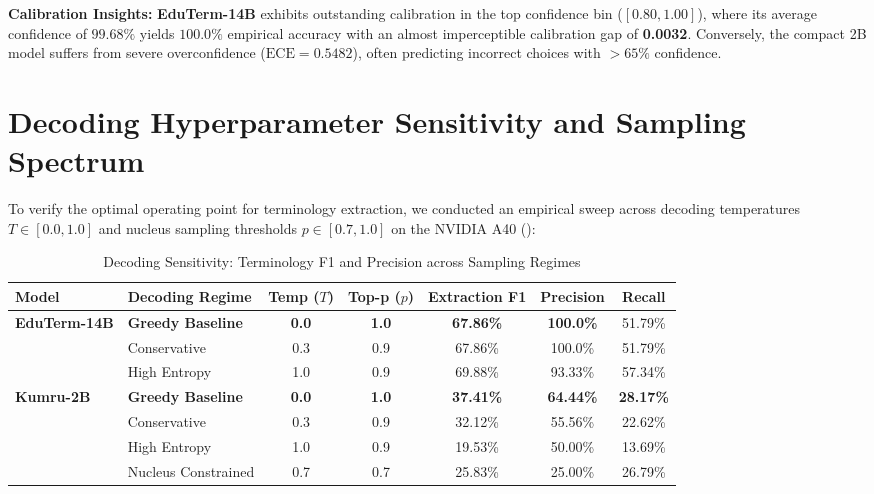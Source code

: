 \documentclass[a4paper,12pt]{report}
\begin{document}
\textbf{Calibration Insights:} \textbf{EduTerm-14B} exhibits outstanding calibration in the top confidence bin ($[0.80, 1.00]$), where its average confidence of $99.68\%$ yields $100.0\%$ empirical accuracy with an almost imperceptible calibration gap of \textbf{0.0032}. Conversely, the compact 2B model suffers from severe overconfidence ($\text{ECE} = 0.5482$), often predicting incorrect choices with $>65\%$ confidence.

\section{Decoding Hyperparameter Sensitivity and Sampling Spectrum}
\label{sec:decoding_sensitivity}
To verify the optimal operating point for terminology extraction, we conducted an empirical sweep across decoding temperatures $T \in [0.0, 1.0]$ and nucleus sampling thresholds $p \in [0.7, 1.0]$ on the NVIDIA A40 ():

\begin{table}[htbp]
\centering
\small
\caption{Decoding Sensitivity: Terminology F1 and Precision across Sampling Regimes}
\label{tab:decoding_sensitivity}
\scriptsize\setlength{\tabcolsep}{2pt}
\begin{tabularx}{\textwidth}{>{\RaggedRight\arraybackslash}Xlccccc}
\hline
\textbf{Model} & \textbf{Decoding Regime} & \textbf{Temp ($T$)} & \textbf{Top-p ($p$)} & \textbf{Extraction F1} & \textbf{Precision} & \textbf{Recall} \\
\hline
\textbf{EduTerm-14B} & \textbf{Greedy Baseline} & \textbf{0.0} & \textbf{1.0} & \textbf{67.86\%} & \textbf{100.0\%} & 51.79\% \\
& Conservative & 0.3 & 0.9 & 67.86\% & 100.0\% & 51.79\% \\
& High Entropy & 1.0 & 0.9 & 69.88\% & 93.33\% & 57.34\% \\
\hline
\textbf{Kumru-2B} & \textbf{Greedy Baseline} & \textbf{0.0} & \textbf{1.0} & \textbf{37.41\%} & \textbf{64.44\%} & \textbf{28.17\%} \\
& Conservative & 0.3 & 0.9 & 32.12\% & 55.56\% & 22.62\% \\
& High Entropy & 1.0 & 0.9 & 19.53\% & 50.00\% & 13.69\% \\
& Nucleus Constrained & 0.7 & 0.7 & 25.83\% & 25.00\% & 26.79\% \\
\hline
\end{tabularx}
\end{table}
\end{document}
